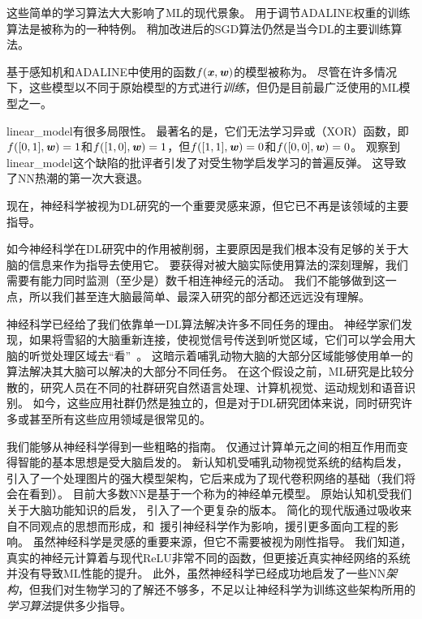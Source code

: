 这些简单的学习算法大大影响了\gls{ML}的现代景象。
用于调节ADALINE权重的训练算法是被称为的一种特例。
稍加改进后的\gls{SGD}算法仍然是当今\gls{DL}的主要训练算法。

基于感知机和ADALINE中使用的函数$f(\boldsymbol{\mathit{x}}, \boldsymbol{\mathit{w}})$的模型被称为。
尽管在许多情况下，这些模型以不同于原始模型的方式进行\emph{训练}，但仍是目前最广泛使用的\gls{ML}模型之一。

\gls{linear_model}有很多局限性。
最著名的是，它们无法学习异或（XOR）函数，即$f([0,1], \boldsymbol{\mathit{w}}) = 1$和$f([1,0], \boldsymbol{\mathit{w}})=1$，但$f([1,1], \boldsymbol{\mathit{w}})=0$和$f([0,0],\boldsymbol{\mathit{w}})= 0$。
观察到\gls{linear_model}这个缺陷的批评者引发了对受生物学启发学习的普遍反弹\citep{Minsky69}。
这导致了\gls{NN}热潮的第一次大衰退。

现在，神经科学被视为\gls{DL}研究的一个重要灵感来源，但它已不再是该领域的主要指导。


如今神经科学在\gls{DL}研究中的作用被削弱，主要原因是我们根本没有足够的关于大脑的信息来作为指导去使用它。
要获得对被大脑实际使用算法的深刻理解，我们需要有能力同时监测（至少是）数千相连神经元的活动。
我们不能够做到这一点，所以我们甚至连大脑最简单、最深入研究的部分都还远远没有理解\citep{olshausen:2005}。

神经科学已经给了我们依靠单一\gls{DL}算法解决许多不同任务的理由。
神经学家们发现，如果将雪貂的大脑重新连接，使视觉信号传送到听觉区域，它们可以学会用大脑的听觉处理区域去``看''~\citep{von2000visual}。
这暗示着哺乳动物大脑的大部分区域能够使用单一的算法解决其大脑可以解决的大部分不同任务。
在这个假设之前，\gls{ML}研究是比较分散的，研究人员在不同的社群研究自然语言处理、计算机视觉、运动规划和语音识别。
如今，这些应用社群仍然是独立的，但是对于\gls{DL}研究团体来说，同时研究许多或甚至所有这些应用领域是很常见的。

我们能够从神经科学得到一些粗略的指南。
仅通过计算单元之间的相互作用而变得智能的基本思想是受大脑启发的。
新认知机\citep{Fukushima80}受哺乳动物视觉系统的结构启发，引入了一个处理图片的强大模型架构，它后来成为了现代卷积网络的基础\citep{LeCun98-small}（我们将会在看到）。
目前大多数\gls{NN}是基于一个称为的神经单元模型。
原始认知机\citep{Fukushima75}受我们关于大脑功能知识的启发， 引入了一个更复杂的版本。
简化的现代版通过吸收来自不同观点的思想而形成，\citet{Nair-2010}和~\citet{Glorot+al-AI-2011-small}援引神经科学作为影响，\citet{Jarrett-ICCV2009}援引更多面向工程的影响。
虽然神经科学是灵感的重要来源，但它不需要被视为刚性指导。
我们知道，真实的神经元计算着与现代\gls{ReLU}非常不同的函数，但更接近真实神经网络的系统并没有导致\gls{ML}性能的提升。
此外，虽然神经科学已经成功地启发了一些\gls{NN}\emph{架构}，但我们对生物学习的了解还不够多，不足以让神经科学为训练这些架构所用的\emph{学习算法}提供多少指导。


